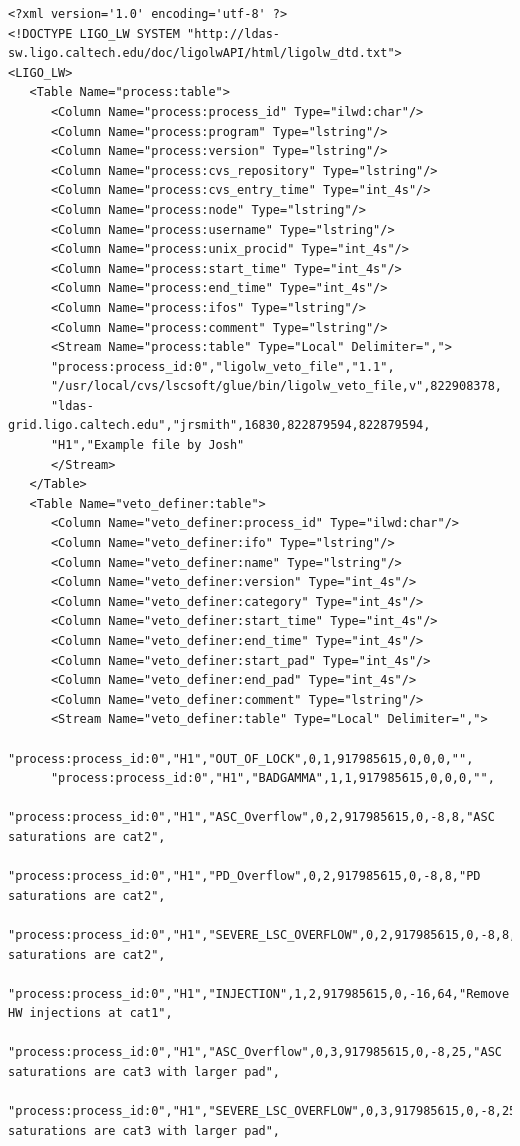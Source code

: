 {\tiny
\begin{verbatim}
<?xml version='1.0' encoding='utf-8' ?>
<!DOCTYPE LIGO_LW SYSTEM "http://ldas-sw.ligo.caltech.edu/doc/ligolwAPI/html/ligolw_dtd.txt">
<LIGO_LW>
   <Table Name="process:table">
      <Column Name="process:process_id" Type="ilwd:char"/>
      <Column Name="process:program" Type="lstring"/>
      <Column Name="process:version" Type="lstring"/>
      <Column Name="process:cvs_repository" Type="lstring"/>
      <Column Name="process:cvs_entry_time" Type="int_4s"/>
      <Column Name="process:node" Type="lstring"/>
      <Column Name="process:username" Type="lstring"/>
      <Column Name="process:unix_procid" Type="int_4s"/>
      <Column Name="process:start_time" Type="int_4s"/>
      <Column Name="process:end_time" Type="int_4s"/>
      <Column Name="process:ifos" Type="lstring"/>
      <Column Name="process:comment" Type="lstring"/>
      <Stream Name="process:table" Type="Local" Delimiter=",">
      "process:process_id:0","ligolw_veto_file","1.1",
      "/usr/local/cvs/lscsoft/glue/bin/ligolw_veto_file,v",822908378,
      "ldas-grid.ligo.caltech.edu","jrsmith",16830,822879594,822879594,
      "H1","Example file by Josh"
      </Stream>
   </Table>
   <Table Name="veto_definer:table">
      <Column Name="veto_definer:process_id" Type="ilwd:char"/>
      <Column Name="veto_definer:ifo" Type="lstring"/>
      <Column Name="veto_definer:name" Type="lstring"/>
      <Column Name="veto_definer:version" Type="int_4s"/>
      <Column Name="veto_definer:category" Type="int_4s"/>
      <Column Name="veto_definer:start_time" Type="int_4s"/>
      <Column Name="veto_definer:end_time" Type="int_4s"/>
      <Column Name="veto_definer:start_pad" Type="int_4s"/>
      <Column Name="veto_definer:end_pad" Type="int_4s"/>
      <Column Name="veto_definer:comment" Type="lstring"/>
      <Stream Name="veto_definer:table" Type="Local" Delimiter=",">
      "process:process_id:0","H1","OUT_OF_LOCK",0,1,917985615,0,0,0,"",
      "process:process_id:0","H1","BADGAMMA",1,1,917985615,0,0,0,"",
      "process:process_id:0","H1","ASC_Overflow",0,2,917985615,0,-8,8,"ASC saturations are cat2",
      "process:process_id:0","H1","PD_Overflow",0,2,917985615,0,-8,8,"PD saturations are cat2",
      "process:process_id:0","H1","SEVERE_LSC_OVERFLOW",0,2,917985615,0,-8,8,"LSC saturations are cat2",
      "process:process_id:0","H1","INJECTION",1,2,917985615,0,-16,64,"Remove HW injections at cat1",
      "process:process_id:0","H1","ASC_Overflow",0,3,917985615,0,-8,25,"ASC saturations are cat3 with larger pad",
      "process:process_id:0","H1","SEVERE_LSC_OVERFLOW",0,3,917985615,0,-8,25,"LSC saturations are cat3 with larger pad",

\end{verbatim}}
